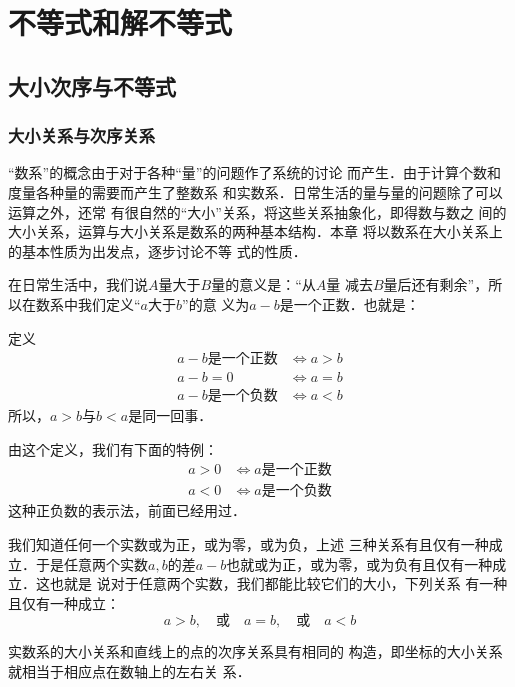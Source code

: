 \chapter{不等式和解不等式}

\section{大小次序与不等式}

\subsection{大小关系与次序关系}

“数系”的概念由于对于各种“量”的问题作了系统的讨论
而产生．由于计算个数和度量各种量的需要而产生了整数系
和实数系．日常生活的量与量的问题除了可以运算之外，还常
有很自然的“大小”关系，将这些关系抽象化，即得数与数之
间的大小关系，运算与大小关系是数系的两种基本结构．本章
将以数系在大小关系上的基本性质为出发点，逐步讨论不等
式的性质．

在日常生活中，我们说$A$量大于$B$量的意义是：“从$A$量
减去$B$量后还有剩余”，所以在数系中我们定义“$a$大于$b$”的意
义为$a-b$是一个正数．也就是：

\begin{blk}{定义}
\[\begin{split}
    a-b\text{是一个正数}&\Longleftrightarrow a>b\\
    a-b=0  &\Longleftrightarrow a=b\\
    a-b\text{是一个负数}&\Longleftrightarrow a<b
\end{split}\]
所以，$a>b$与$b<a$是同一回事．
\end{blk}


由这个定义，我们有下面的特例：
\[\begin{split}
    a>0 &\Longleftrightarrow a\text{是一个正数}\\
    a<0&\Longleftrightarrow a\text{是一个负数} 
\end{split}\]
这种正负数的表示法，前面已经用过．

我们知道任何一个实数或为正，或为零，或为负，上述
三种关系有且仅有一种成立．于是任意两个实数$a,b$的差$a-
b$也就或为正，或为零，或为负有且仅有一种成立．这也就是
说对于任意两个实数，我们都能比较它们的大小，下列关系
有一种且仅有一种成立：
\[a>b,\quad \text{或}\quad a=b,\quad  \text{或}\quad a<b\]

实数系的大小关系和直线上的点的次序关系具有相同的
构造，即坐标的大小关系就相当于相应点在数轴上的左右关
系．

